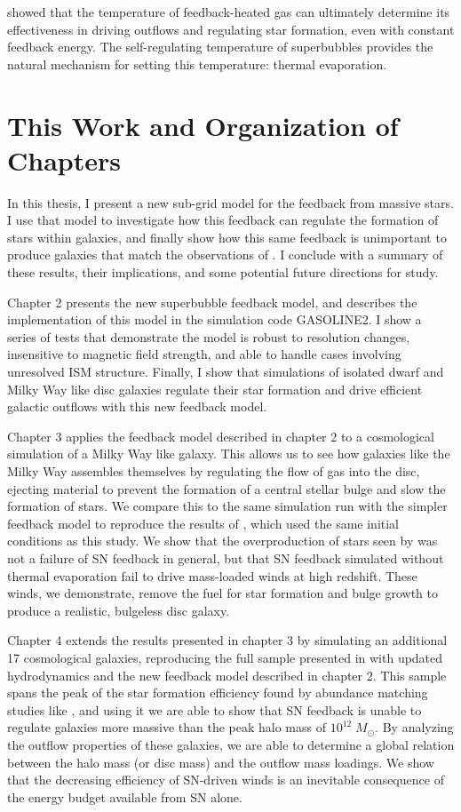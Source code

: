 \citet{DallaVecchia2012} showed that the temperature of feedback-heated gas can
ultimately determine its effectiveness in driving outflows and regulating star
formation, even with constant feedback energy.  The self-regulating temperature
of superbubbles provides the natural mechanism for setting this temperature:
thermal evaporation.

\section{This Work and Organization of Chapters}
In this thesis, I present a new sub-grid model for the feedback from massive
stars.  I use that model to investigate how this feedback can regulate the
formation of stars within galaxies, and finally show how this same feedback is
unimportant to produce galaxies that match the observations of
\citet{McGaugh2016}.  I conclude with a summary of these results, their
implications, and some potential future directions for study.

Chapter 2 presents the new superbubble feedback model, and describes the
implementation of this model in the simulation code {\sc GASOLINE2}.  I show a
series of tests that demonstrate the model is robust to resolution changes, insensitive
to magnetic field strength, and able to handle cases involving unresolved ISM
structure.  Finally, I show that simulations of isolated dwarf and Milky Way
like disc galaxies regulate their star formation and drive efficient galactic
outflows with this new feedback model.

Chapter 3 applies the feedback model described in chapter 2 to a cosmological
simulation of a Milky Way like galaxy.  This allows us to see how galaxies like
the Milky Way assembles themselves by regulating the flow of gas into the disc,
ejecting material to prevent the formation of a central stellar bulge and slow
the formation of stars.  We compare this to the same simulation run with the
simpler \citet{Stinson2006} feedback model to reproduce the results of
\citet{Stinson2010}, which used the same initial conditions as this study.  We
show that the overproduction of stars seen by \citet{Stinson2010} was not a
failure of SN feedback in general, but that SN feedback simulated without 
thermal evaporation fail to drive mass-loaded winds at high redshift.  These
winds, we demonstrate, remove the fuel for star formation and bulge growth to
produce a realistic, bulgeless disc galaxy.

Chapter 4 extends the results presented in chapter 3 by simulating an additional
17 cosmological galaxies, reproducing the full sample presented in
\citet{Stinson2010} with updated hydrodynamics and the new feedback model
described in chapter 2.  This sample spans the peak of the star formation
efficiency found by abundance matching studies like \citet{Moster2013}, and
using it we are able to show that SN feedback is unable to regulate
galaxies more massive than the peak halo mass of $10^{12}\;M_\odot$.  By
analyzing the outflow properties of these galaxies, we are able to determine a
global relation between the halo mass (or disc mass) and the outflow mass
loadings.  We show that the decreasing efficiency of SN-driven winds is an
inevitable consequence of the energy budget available from SN alone.

